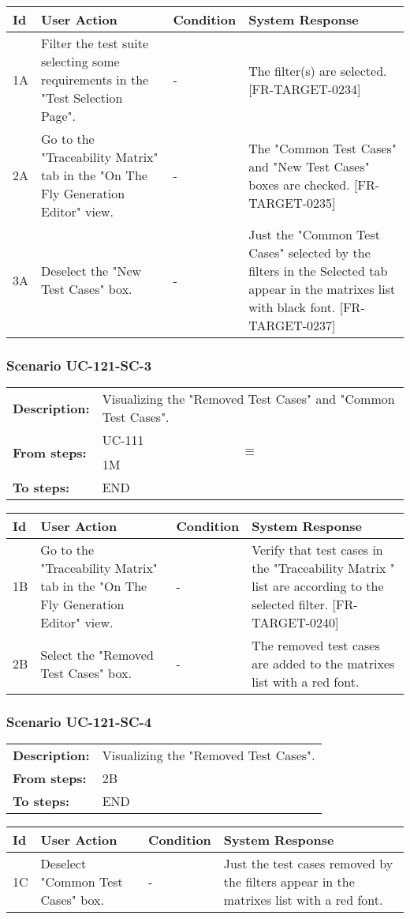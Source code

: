 \documentclass[a4paper,11pt]{article}
\newcommand{\bl}{\\ \hline}
\begin{document}
\begin{tabular}{|p{0.8in}|p{1.6in}|p{1.6in}|p{1.6in}|}
\hline
Id & User Action & Condition & System Response  \bl 
1A & Filter the test suite selecting some requirements in the "Test Selection Page". & - & The filter(s) are selected. [FR-TARGET-0234] \bl 
2A & Go to the "Traceability Matrix" tab in the "On The Fly Generation Editor" view. & - & The "Common Test Cases" and "New Test Cases" boxes are checked. [FR-TARGET-0235] \bl 
3A & Deselect the "New Test Cases" box. & - & Just the "Common Test Cases" selected by the filters in the Selected tab appear in the matrixes list with black font. [FR-TARGET-0237] \bl 
\end{tabular}
\subsubsection*{Scenario UC-121-SC-3}
\begin{tabular}{p{1in}p{4in}}
{\bf Description:} & Visualizing the "Removed Test Cases" and "Common Test Cases". \\
{\bf From steps:} & UC-111$$\equiv$$1M \\
{\bf To steps:} & END \\
\end{tabular}
 
\begin{tabular}{|p{0.8in}|p{1.6in}|p{1.6in}|p{1.6in}|}
\hline
Id & User Action & Condition & System Response  \bl 
1B & Go to the "Traceability Matrix" tab in the "On The Fly Generation Editor" view. & - & Verify that test cases in the "Traceability Matrix " list are according to the selected filter. [FR-TARGET-0240] \bl 
2B & Select the "Removed Test Cases" box. & - & The removed test cases are added to the matrixes list with a red font. \bl 
\end{tabular}
\subsubsection*{Scenario UC-121-SC-4}
\begin{tabular}{p{1in}p{4in}}
{\bf Description:} & Visualizing the "Removed Test Cases". \\
{\bf From steps:} & 2B \\
{\bf To steps:} & END \\
\end{tabular}
 
\begin{tabular}{|p{0.8in}|p{1.6in}|p{1.6in}|p{1.6in}|}
\hline
Id & User Action & Condition & System Response  \bl 
1C & Deselect "Common Test Cases" box. & - & Just the test cases removed by the filters appear in the matrixes list with a red font. \bl 
\end{tabular}
\end{document}
